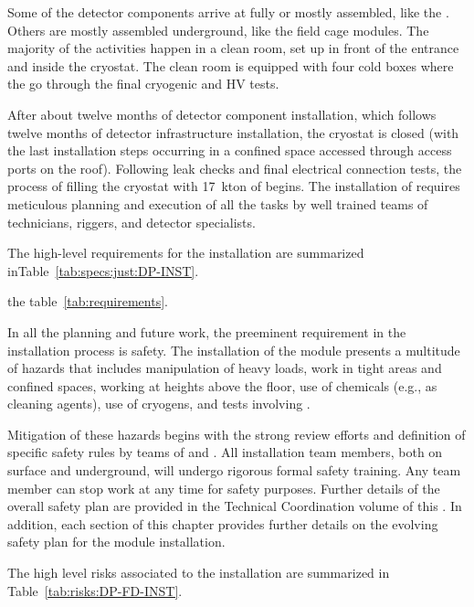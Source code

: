 Some of the detector components arrive at  fully or mostly assembled, like the .
Others are mostly assembled underground, like the field cage modules.
The majority of the activities happen in a clean room, set up in front of the  entrance and inside the cryostat.
The clean room is equipped with four cold boxes where the  go through the final cryogenic and HV tests.

After about twelve months of detector component installation, which follows twelve months of detector infrastructure installation, the cryostat is closed (with the last installation steps occurring in a confined space accessed through access ports on the roof). %
Following leak checks and final electrical connection tests, the process of filling the cryostat with 17~kton of  begins.
The installation of  requires meticulous planning and execution of all the tasks by well trained teams of technicians, riggers, and detector specialists.

The high-level requirements for the  installation are summarized inTable~\ref{tab:specs:just:DP-INST}. 

the table~\ref{tab:requirements}.


In all the planning and future work, the preeminent requirement in the installation process is safety.
The installation of the  module presents a multitude of hazards that includes manipulation of heavy loads, work in tight areas and confined spaces, working at heights above the floor, use of chemicals (e.g., as cleaning agents), use of cryogens, and  tests involving .

Mitigation of these hazards begins with the strong review efforts and definition of specific safety rules by  teams of  and .
All installation team members, both on surface and underground, will undergo rigorous formal safety training.
Any team member can stop work at any time for safety purposes.
Further details of the overall  safety plan are provided in the Technical Coordination volume of this .
In addition, each section of this chapter provides further details on the evolving safety plan for the  module installation.


The high level risks associated to the  installation are summarized in Table~\ref{tab:risks:DP-FD-INST}.




